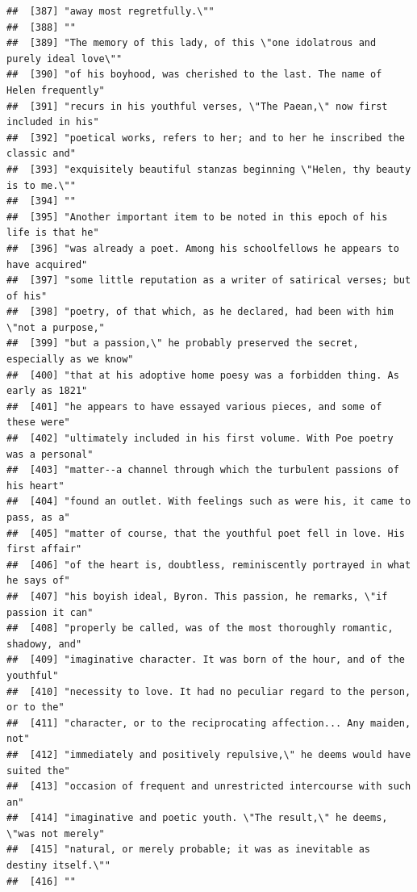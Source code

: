 \documentclass{article}\usepackage[]{graphicx}\usepackage[]{color}
\makeatletter
\newenvironment{kframe}{%
 \def\at@end@of@kframe{}%
 \ifinner\ifhmode%
  \def\at@end@of@kframe{\end{minipage}}%
  \begin{minipage}{\columnwidth}%
 \fi\fi%
 \def\FrameCommand##1{\hskip\@totalleftmargin \hskip-\fboxsep
 \colorbox{shadecolor}{##1}\hskip-\fboxsep
     \hskip-\linewidth \hskip-\@totalleftmargin \hskip\columnwidth}%
 \MakeFramed {\advance\hsize-\width
   \@totalleftmargin\z@ \linewidth\hsize
   \@setminipage}}%
 {\par\unskip\endMakeFramed%
 \at@end@of@kframe}
\newenvironment{knitrout}{}{} %
\makeatother
\begin{document}
\begin{knitrout}
\begin{kframe}
\begin{verbatim}
##  [387] "away most regretfully.\""                                                    
##  [388] ""                                                                            
##  [389] "The memory of this lady, of this \"one idolatrous and purely ideal love\""   
##  [390] "of his boyhood, was cherished to the last. The name of Helen frequently"     
##  [391] "recurs in his youthful verses, \"The Paean,\" now first included in his"     
##  [392] "poetical works, refers to her; and to her he inscribed the classic and"      
##  [393] "exquisitely beautiful stanzas beginning \"Helen, thy beauty is to me.\""     
##  [394] ""                                                                            
##  [395] "Another important item to be noted in this epoch of his life is that he"     
##  [396] "was already a poet. Among his schoolfellows he appears to have acquired"     
##  [397] "some little reputation as a writer of satirical verses; but of his"          
##  [398] "poetry, of that which, as he declared, had been with him \"not a purpose,"   
##  [399] "but a passion,\" he probably preserved the secret, especially as we know"    
##  [400] "that at his adoptive home poesy was a forbidden thing. As early as 1821"     
##  [401] "he appears to have essayed various pieces, and some of these were"           
##  [402] "ultimately included in his first volume. With Poe poetry was a personal"     
##  [403] "matter--a channel through which the turbulent passions of his heart"         
##  [404] "found an outlet. With feelings such as were his, it came to pass, as a"      
##  [405] "matter of course, that the youthful poet fell in love. His first affair"     
##  [406] "of the heart is, doubtless, reminiscently portrayed in what he says of"      
##  [407] "his boyish ideal, Byron. This passion, he remarks, \"if passion it can"      
##  [408] "properly be called, was of the most thoroughly romantic, shadowy, and"       
##  [409] "imaginative character. It was born of the hour, and of the youthful"         
##  [410] "necessity to love. It had no peculiar regard to the person, or to the"       
##  [411] "character, or to the reciprocating affection... Any maiden, not"             
##  [412] "immediately and positively repulsive,\" he deems would have suited the"      
##  [413] "occasion of frequent and unrestricted intercourse with such an"              
##  [414] "imaginative and poetic youth. \"The result,\" he deems, \"was not merely"    
##  [415] "natural, or merely probable; it was as inevitable as destiny itself.\""      
##  [416] ""                                                                            

\end{verbatim}
\end{kframe}
\end{knitrout}
\end{document}
